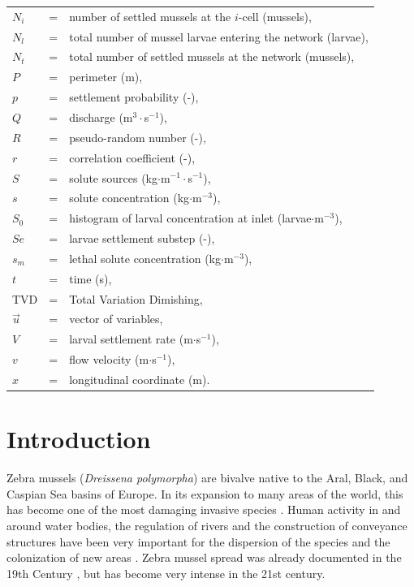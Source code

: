 \documentclass[review,authoryear]{elsarticle}
\begin{document}
{\begin{tabular}{lcl}
$N_i$ & = & number of settled mussels at the $i$-cell (mussels),\\
$N_l$ & = & total number of mussel larvae entering the network (larvae),\\
$N_t$ & = & total number of settled mussels at the network (mussels),\\
$P$ & = & perimeter (m),\\
$p$ & = & settlement probability (-),\\
$Q$ & = & discharge (m$^3\cdot$s$^{-1}$),\\
$R$ & = & pseudo-random number (-),\\
$r$ & = & correlation coefficient (-),\\
$S$ & = & solute sources (kg$\cdot$m$^{-1}\cdot$s$^{-1}$),\\
$s$ & = & solute concentration (kg$\cdot$m$^{-3}$),\\
$S_0$ & = & histogram of larval concentration at inlet (larvae$\cdot$m$^{-3}$),
	\\
$Se$ & = & larvae settlement substep (-),\\
$s_m$ & = & lethal solute concentration (kg$\cdot$m$^{-3}$),\\
$t$ & = & time (s),\\
TVD & = & Total Variation Dimishing,\\
$\vec{u}$ & = & vector of variables,\\
$V$ & = & larval settlement rate (m$\cdot$s$^{-1}$),\\
$v$ & = & flow velocity (m$\cdot$s$^{-1}$),\\
$x$ & = & longitudinal coordinate (m).\\
\end{tabular}
}

\section{Introduction}

Zebra mussels (\textit{Dreissena polymorpha}) are bivalve native to the Aral,
Black, and Caspian Sea basins of Europe. In its expansion to many areas of the
world, this has become one of the most damaging invasive species
\citep{USACE13}. Human activity in and around water bodies, the regulation of
rivers and the construction of conveyance structures have been very important
for the dispersion of the species and the colonization of new areas
\citep{Araujo06}. Zebra mussel spread was already documented in the 19th Century
\citep{Aldridge04}, but has become very intense in the 21st century.
\end{document}
